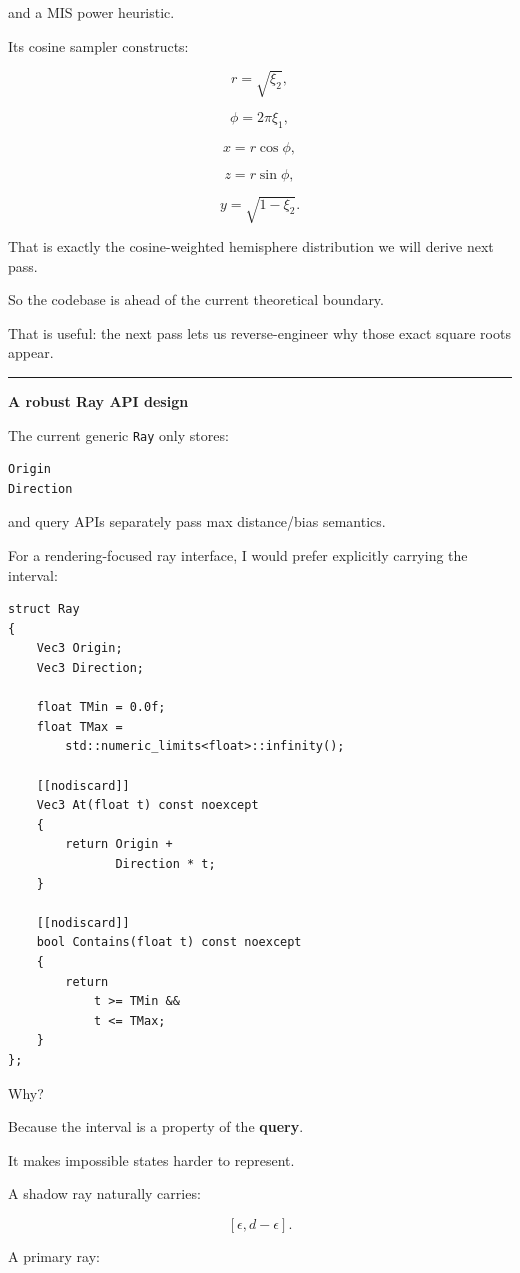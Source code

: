 and a MIS power heuristic.

Its cosine sampler constructs:

\[
r=\sqrt{\xi_2},
\]

\[
\phi=2\pi\xi_1,
\]

\[
x=r\cos\phi,
\]

\[
z=r\sin\phi,
\]

\[
y=\sqrt{1-\xi_2}.
\]

That is exactly the cosine-weighted hemisphere distribution we will derive next pass.

So the codebase is ahead of the current theoretical boundary.

That is useful: the next pass lets us reverse-engineer why those exact square roots appear.

\begin{center}\rule{0.5\linewidth}{0.5pt}\end{center}

\textbf{A robust Ray API design}

The current generic \texttt{Ray} only stores:

\begin{verbatim}
Origin
Direction
\end{verbatim}

and query APIs separately pass max distance/bias semantics.

For a rendering-focused ray interface, I would prefer explicitly carrying the interval:

\begin{verbatim}
struct Ray
{
    Vec3 Origin;
    Vec3 Direction;

    float TMin = 0.0f;
    float TMax =
        std::numeric_limits<float>::infinity();

    [[nodiscard]]
    Vec3 At(float t) const noexcept
    {
        return Origin +
               Direction * t;
    }

    [[nodiscard]]
    bool Contains(float t) const noexcept
    {
        return
            t >= TMin &&
            t <= TMax;
    }
};
\end{verbatim}

Why?

Because the interval is a property of the \textbf{query}.

It makes impossible states harder to represent.

A shadow ray naturally carries:

\[
[\epsilon,d-\epsilon].
\]

A primary ray:

